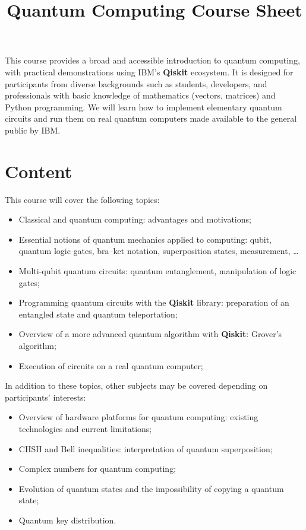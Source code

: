 \documentclass[11pt]{article}
\title{Quantum Computing Course Sheet}
\date{}
\begin{document}
\maketitle

This course provides a broad and accessible introduction to quantum computing, with practical demonstrations using IBM's \textbf{Qiskit} ecosystem. It is designed for participants from diverse backgrounds such as students, developers, and professionals with basic knowledge of mathematics (vectors, matrices) and Python programming. We will learn how to implement elementary quantum circuits and run them on real quantum computers made available to the general public by IBM.

\section*{Content}

This course will cover the following topics:

\begin{itemize}[leftmargin=*,itemsep=0.4em]
\item Classical and quantum computing: advantages and motivations;
\item Essential notions of quantum mechanics applied to computing: qubit, quantum logic gates, bra--ket notation, superposition states, measurement, \ldots
\item Multi-qubit quantum circuits: quantum entanglement, manipulation of logic gates;
\item Programming quantum circuits with the \textbf{Qiskit} library: preparation of an entangled state and quantum teleportation;
\item Overview of a more advanced quantum algorithm with \textbf{Qiskit}: Grover's algorithm;
\item Execution of circuits on a real quantum computer;
\end{itemize}

In addition to these topics, other subjects may be covered depending on participants' interests:

\begin{itemize}[leftmargin=*,itemsep=0.4em]
\item Overview of hardware platforms for quantum computing: existing technologies and current limitations;
\item CHSH and Bell inequalities: interpretation of quantum superposition;
\item Complex numbers for quantum computing;
\item Evolution of quantum states and the impossibility of copying a quantum state;
\item Quantum key distribution.
\end{itemize}
\end{document}
